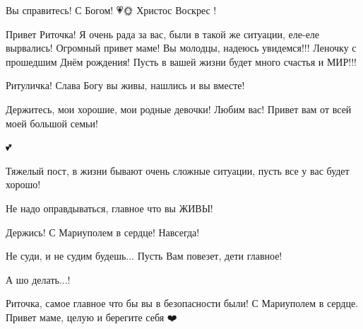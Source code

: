 
Вы справитесь! С Богом! 💗🌞 Христос Воскрес ! 🙏


Привет Риточка! Я очень рада за вас, были в такой же ситуации, еле-еле
вырвались! Огромный привет маме! Вы молодцы, надеюсь увидемся!!! Леночку с
прошедшим Днём рождения! Пусть в вашей жизни будет много счастья и МИР!!!


Ритуличка! Слава Богу вы живы, нашлись и вы вместе!

Держитесь, мои хорошие, мои родные девочки! Любим вас! Привет вам от всей моей
большой семьи!

💕


Тяжелый пост, в жизни бывают очень сложные ситуации, пусть все у вас будет хорошо!


Не надо оправдываться, главное что вы ЖИВЫ!


Держись! С Мариуполем в сердце! Навсегда!


Не суди, и не судим будешь... Пусть Вам повезет, дети главное!


А шо делать...!


Риточка, самое главное что бы вы в безопасности были! С Мариуполем в сердце.
Привет маме, целую и берегите себя ❤️
